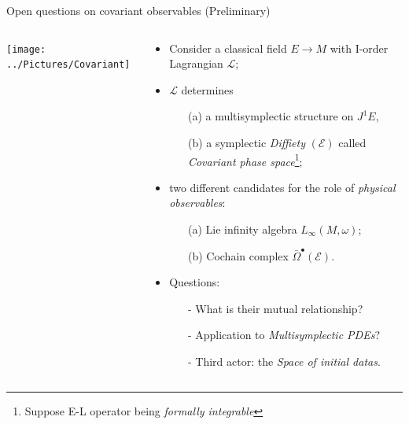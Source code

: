 \documentclass[handout,10pt]{beamer}
\begin{document}
\begin{frame}{Open questions on covariant observables (Preliminary)}
	\begin{columns}
		\begin{column}{.50\linewidth}
			\begin{center}
				\texttt{[image: ../Pictures/Covariant]}			
			\end{center}
		\end{column}
		\begin{column}{.50\linewidth}
			\begin{itemize}
				\item Consider a classical field $E\to M$ with I-order Lagrangian $\mathcal{L}$;
				\item<2-> $\mathcal{L}$ determines  
					\begin{itemize}
						\item[(a)] a multisymplectic structure on $J^1 E$,
						\item[(b)] a symplectic \emph{Diffiety} $(\mathcal{E})$ called \emph{Covariant phase space}\footnote{Suppose E-L operator being \emph{formally integrable}};
					\end{itemize}
				\item<3-> two different candidates for the role of \emph{physical observables}:
					\begin{itemize}
						\item[(a)] Lie infinity algebra $L_\infty (M,\omega)$;
						\item[(b)] Cochain complex $\bar{\Omega}^\bullet(\mathcal{E})$.
					\end{itemize}
				\item<4-> Questions:
					\begin{itemize}
						\item[-] What is their mutual relationship?
						\item[-] Application to \emph{Multisymplectic PDEs}?
						\item[-] Third actor: the \emph{Space of initial datas}.
					\end{itemize}																		
			\end{itemize}
		\end{column}
	\end{columns}
\end{frame}
\end{document}
